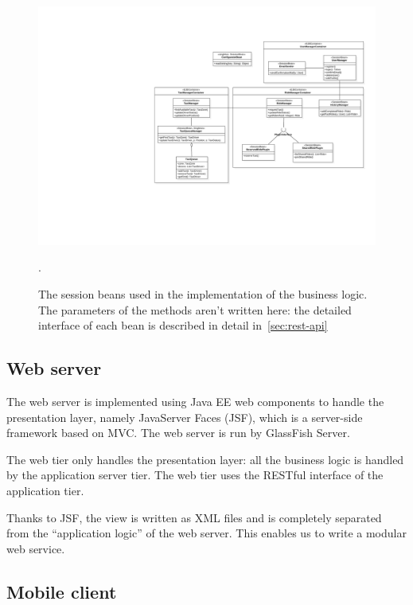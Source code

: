 \begin{figure}
    \centering
    \includegraphics[width=\textwidth]{diagrams/class_sessionbeans}
    \caption{The session beans used in the implementation of the business logic. The parameters of the methods aren't written here: the detailed interface of each bean is described in detail in~\autoref{sec:rest-api}}.
    \label{fig:session-beans}
\end{figure}

\subsection{Web server}
The web server is implemented using Java EE web components to handle the presentation layer, namely JavaServer Faces (JSF), which is a server-side framework based on MVC.
The web server is run by GlassFish Server.

The web tier only handles the presentation layer: all the business logic is handled by the application server tier. The web tier uses the RESTful interface of the application tier.

Thanks to JSF, the view is written as XML files and is completely separated from the ``application logic'' of the web server. This enables us to write a modular web service.

\subsection{Mobile client}

\FloatBarrier
